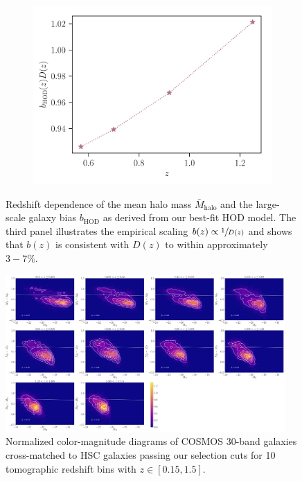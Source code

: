 \documentclass[a4paper,11pt]{article}
\begin{document}
\begin{figure}
\begin{center}
\begin{subfigure}{0.32\textwidth}
          \end{subfigure}
          \begin{subfigure}{0.32\textwidth}
          \includegraphics[width=\textwidth]{figures/bias-growth_mPk=HOD_fix=alpha-fc-sigmaM_HOD=zevol_fit=pz-shifts-pz-widths+prior=0p2_fit=auto+cross_cosmo=const_cov=G+NG+SSC-LINBIAS_HOD-param=zfid_clfit=HOD-zevol.pdf}
          \end{subfigure}
          \caption{Redshift dependence of the mean halo mass $\bar{M}_{\mathrm{halo}}$ and the large-scale galaxy bias $b_{\mathrm{HOD}}$ as derived from our best-fit HOD model. The third panel illustrates the empirical scaling $b(z) \propto \sfrac{1}{D(z)}$ and shows that $b(z)$ is consistent with $D(z)$ to within approximately $3-7 \%$.}
          \label{fig:HOD-redshift}
        \end{center}
      \end{figure}

      \begin{figure}
        \begin{center}
          \includegraphics[width=0.95\textwidth]{figures/color-magnitude_cut=COSMOS30_nbin=10_weights=True.pdf}
          \caption{Normalized color-magnitude diagrams of COSMOS 30-band galaxies cross-matched to HSC galaxies passing our selection cuts for 10 tomographic redshift bins with $z \in [0.15, 1.5]$.}
          \label{fig:color-mag}
        \end{center}
      \end{figure}
      
\end{document}
